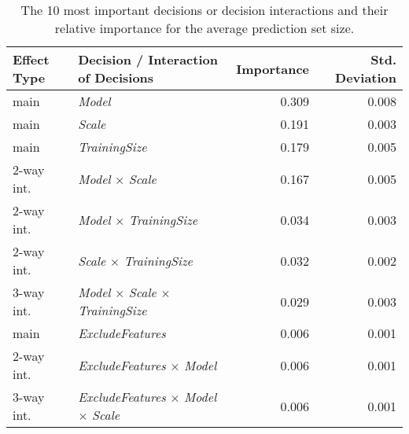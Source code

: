 \begin{table}
\centering
\caption{The 10 most important decisions or decision interactions and their relative importance for the average prediction set size.}
\label{tab:fanova_top10}
\begin{tabular}{llrr}
\toprule
Effect Type &                                      Decision / Interaction of Decisions &  Importance &  Std. Deviation \\
\midrule
       main &                                                           \textit{Model} &       0.309 &           0.008 \\
       main &                                                           \textit{Scale} &       0.191 &           0.003 \\
       main &                                                    \textit{TrainingSize} &       0.179 &           0.005 \\
 2-way int. &                                   \textit{Model} $\times$ \textit{Scale} &       0.167 &           0.005 \\
 2-way int. &                            \textit{Model} $\times$ \textit{TrainingSize} &       0.034 &           0.003 \\
 2-way int. &                            \textit{Scale} $\times$ \textit{TrainingSize} &       0.032 &           0.002 \\
 3-way int. &    \textit{Model} $\times$ \textit{Scale} $\times$ \textit{TrainingSize} &       0.029 &           0.003 \\
       main &                                                 \textit{ExcludeFeatures} &       0.006 &           0.001 \\
 2-way int. &                         \textit{ExcludeFeatures} $\times$ \textit{Model} &       0.006 &           0.001 \\
 3-way int. & \textit{ExcludeFeatures} $\times$ \textit{Model} $\times$ \textit{Scale} &       0.006 &           0.001 \\
\bottomrule
\end{tabular}
\end{table}
